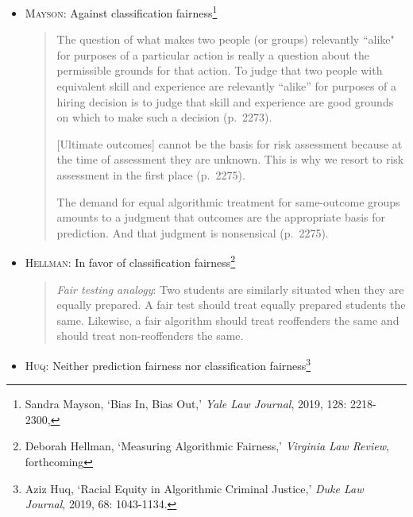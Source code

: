 \documentclass{tufte-handout}
\begin{document}
\begin{itemize}

\item[] \textsc{Mayson:} Against classification fairness\footnote{Sandra Mayson, `Bias In, Bias Out,' \textit{Yale Law Journal}, 2019, 128: 2218-2300,}


\begin{quote}

The question of what makes two people (or groups) relevantly ``alike" for purposes of a particular action is really a question about the permissible grounds for that action. To judge that two people with equivalent skill and experience are relevantly ``alike'' for purposes of a hiring decision is to judge that skill and experience are good grounds on which to make such a decision (p.\ 2273).


[Ultimate outcomes] cannot be the basis for risk assessment because at the time of assessment they are unknown. This is why we resort to risk assessment in the first place (p.\ 2275).

The demand for equal algorithmic treatment for same-outcome groups amounts to a judgment that outcomes are the appropriate basis for prediction. And that judgment is nonsensical (p.\ 2275).

\end{quote}

\item[] \textsc{Hellman:} In favor of classification fairness\footnote{Deborah Hellman, `Measuring Algorithmic Fairness,' \textit{Virginia Law Review}, forthcoming}

\begin{quote}
\textit{Fair testing analogy}: Two students are similarly situated when they are equally prepared. A fair test should treat equally prepared students 
the same. %
Likewise, a fair algorithm should treat 
reoffenders the same and should treat non-reoffenders the same. 
\end{quote}




\item[] \textsc{Huq:} Neither prediction fairness nor classification fairness\footnote{Aziz Huq, `Racial Equity in Algorithmic Criminal Justice,' \textit{Duke Law Journal}, 2019, 68: 1043-1134.}


\end{itemize}
\end{document}
